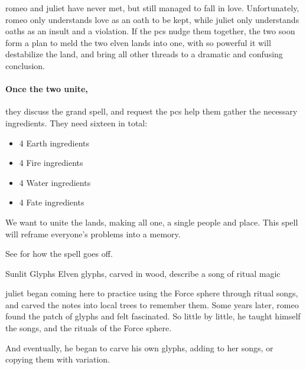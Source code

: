 
\Gls{romeo} and \gls{juliet} have never met, but still managed to fall in love.
Unfortunately, \gls{romeo} only understands love as an oath to be kept, while \gls{juliet} only understands oaths as an insult and a violation.
If the \glspl{pc} nudge them together, the two soon form a plan to meld the two elven lands into one, with  so powerful it will destabilize the land, and bring all other threads to a dramatic and confusing conclusion.

\paragraph{Once the two unite,}
they discuss the grand spell, and request the \glspl{pc} help them gather the necessary \glspl{ingredient}.
They need sixteen in total:

\begin{itemize}
  \item
  4 Earth \glspl{ingredient}
  \item
  4 Fire \glspl{ingredient}
  \item
  4 Water \glspl{ingredient}
  \item
  4 Fate \glspl{ingredient}
\end{itemize}

\begin{exampletext}
  We want to unite the lands, making all one, a single people and place.
  This \gls{spell} will reframe everyone's problems into a memory.
\end{exampletext}

See  for how the spell goes off.

{Sunlit Glyphs}%
{Elven glyphs, carved in wood, describe a song of ritual magic}%

\begin{exampletext}
  \Gls{juliet} began coming here to practice using the Force \gls{sphere} through ritual songs, and carved the notes into local trees to remember them.
  Some years later, \gls{romeo} found the patch of glyphs and felt fascinated.
  So little by little, he taught himself the songs, and the rituals of the Force \gls{sphere}.

  And eventually, he began to carve his own glyphs, adding to her songs, or copying them with variation.
\end{exampletext}


